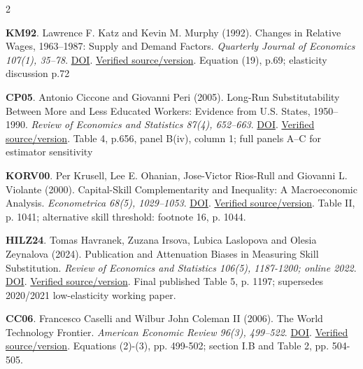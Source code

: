 \documentclass[10pt,a4paper,landscape]{article}
\begin{document}
\begin{multicols}{2}
\begin{minipage}{\linewidth}\hypertarget{ref:KM92}{}\textbf{KM92}. Lawrence F. Katz and Kevin M. Murphy (1992). Changes in Relative Wages, 1963--1987: Supply and Demand Factors. \emph{Quarterly Journal of Economics 107(1), 35--78}. \href{https://doi.org/10.2307/2118323}{DOI}. \href{https://lkatz.scholars.harvard.edu/sites/g/files/omnuum5961/files/lkatz/files/changes_in_relative_wages_1963-1987_supply_and_demand_factors.pdf}{Verified source/version}. Equation (19), p.69; elasticity discussion p.72\end{minipage}\par
\begin{minipage}{\linewidth}\hypertarget{ref:CP05}{}\textbf{CP05}. Antonio Ciccone and Giovanni Peri (2005). Long-Run Substitutability Between More and Less Educated Workers: Evidence from U.S. States, 1950--1990. \emph{Review of Economics and Statistics 87(4), 652--663}. \href{https://doi.org/10.1162/003465305775098233}{DOI}. \href{https://giovanniperi.ucdavis.edu/uploads/5/6/8/2/56826033/ciccone_peri_long_run_substitutability_\%40005.pdf}{Verified source/version}. Table 4, p.656, panel B(iv), column 1; full panels A--C for estimator sensitivity\end{minipage}\par
\begin{minipage}{\linewidth}\hypertarget{ref:KORV00}{}\textbf{KORV00}. Per Krusell, Lee E. Ohanian, Jose-Victor Rios-Rull and Giovanni L. Violante (2000). Capital-Skill Complementarity and Inequality: A Macroeconomic Analysis. \emph{Econometrica 68(5), 1029--1053}. \href{https://doi.org/10.1111/1468-0262.00150}{DOI}. \href{https://www.jonathanheathcote.com/KORV.pdf}{Verified source/version}. Table II, p. 1041; alternative skill threshold: footnote 16, p. 1044.\end{minipage}\par
\begin{minipage}{\linewidth}\hypertarget{ref:HILZ24}{}\textbf{HILZ24}. Tomas Havranek, Zuzana Irsova, Lubica Laslopova and Olesia Zeynalova (2024). Publication and Attenuation Biases in Measuring Skill Substitution. \emph{Review of Economics and Statistics 106(5), 1187-1200; online 2022}. \href{https://doi.org/10.1162/rest_a_01227}{DOI}. \href{https://meta-analysis.cz/skill/skill2.pdf}{Verified source/version}. Final published Table 5, p. 1197; supersedes 2020/2021 low-elasticity working paper.\end{minipage}\par
\begin{minipage}{\linewidth}\hypertarget{ref:CC06}{}\textbf{CC06}. Francesco Caselli and Wilbur John Coleman II (2006). The World Technology Frontier. \emph{American Economic Review 96(3), 499--522}. \href{https://doi.org/10.1257/aer.96.3.499}{DOI}. \href{https://personal.lse.ac.uk/casellif/papers/wtf.pdf}{Verified source/version}. Equations (2)-(3), pp. 499-502; section I.B and Table 2, pp. 504-505.\end{minipage}\par

\end{multicols}
\end{document}
